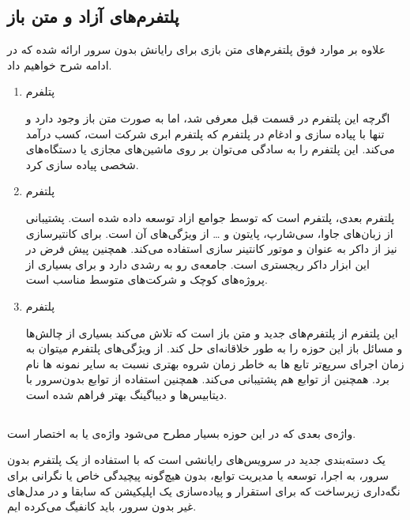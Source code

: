 \subsection{پلتفرم‌های آزاد و متن باز}
علاوه بر موارد فوق پلتفرم‌های متن بازی برای رایانش بدون سرور ارائه شده که در ادامه شرح خواهیم داد. 

\begin{enumerate}
	
	\item پتلفرم 
	
	اگرچه این پلتفرم در قسمت قبل معرفی شد، اما به صورت متن باز وجود دارد و تنها  با پیاده سازی و ادغام در پلتفرم  که پلتفرم ابری شرکت  است، کسب درآمد می‌کند.  این پلتفرم را به سادگی می‌توان بر روی ماشین‌های مجازی یا دستگاه‌های شخصی پیاده سازی کرد. 
	
	\item پلتفرم  
	
	پلتفرم بعدی، پلتفرم  است که توسط جوامع ازاد توسعه داده شده است. پشتیبانی از زبان‌های جاوا، سی‌شارپ، پایتون و … از ویژگی‌های آن است. برای کانتیرسازی نیز از داکر به عنوان  و موتور کانتینر سازی استفاده می‌کند. همچنین  پیش فرض در این ابزار داکر ریجستری است. جامعه‌ی رو به رشدی دارد و برای بسیاری از پروژه‌های کوچک و شرکت‌های متوسط مناسب است.
	
	\item پلتفرم ‌
	
	این پلتفرم از پلتفرم‌های جدید و متن باز است که تلاش می‌کند بسیاری از چالش‌ها و مسائل باز این حوزه را به طور خلاقانه‌ای حل کند. از ویژگی‌های پلتفرم  میتوان به زمان اجرای سریع‌تر تابع ها به خاطر زمان شروه بهتری نسبت به سایر نمونه ها نام برد. همچنین از توابع  هم پشتیبانی می‌کند. همچنین استفاده از توابع بدون‌سرور با دیتابیس‌ها و دیباگینگ بهتر فراهم شده است. \cite{hendrickson2016serverless}
	
\end{enumerate}

\subsection{}

واژه‌ی بعدی که در این حوزه بسیار مطرح می‌شود واژه‌ی  یا به اختصار  است. 

 یک دسته‌بندی جدید در سرویس‌های رایانشی است که با استفاده از یک پلتفرم بدون سرور، به اجرا، توسعه یا مدیریت توابع، بدون هیچ‌گونه پیچیدگی خاص یا نگرانی برای نگه‌داری زیرساخت که برای استقرار و پیاده‌سازی یک اپلیکیشن که سابقا و در مدل‌های غیر بدون سرور، باید کانفیگ می‌کرده ایم. 

